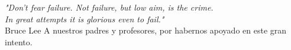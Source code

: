 \begin{dedication}
     \emph{"Don't fear failure. 
    Not failure, but low aim, is the crime.\\ 
    \noindent In great attempts it is glorious even to fail."\\
    }
    \hfill  Bruce Lee
    \newline
    \newline
    \newline
    \newline
    A nuestros padres y profesores, por habernos apoyado en este gran intento.

\end{dedication}